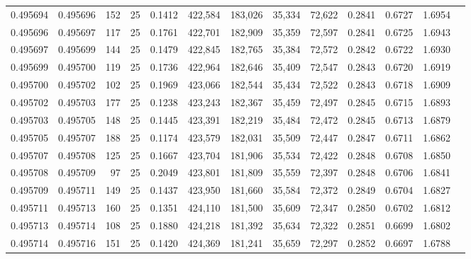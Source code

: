 \begin{tabular}{rrrrrrrrrrrrr}
0.495694 & 0.495696 &   152 &  25 &                                     0.1412 & 422,584 & 183,026 &  35,334 &  72,622 & 0.2841 & 0.6727 & 1.6954 \\
0.495696 & 0.495697 &   117 &  25 &                                     0.1761 & 422,701 & 182,909 &  35,359 &  72,597 & 0.2841 & 0.6725 & 1.6943 \\
0.495697 & 0.495699 &   144 &  25 &                                     0.1479 & 422,845 & 182,765 &  35,384 &  72,572 & 0.2842 & 0.6722 & 1.6930 \\
0.495699 & 0.495700 &   119 &  25 &                                     0.1736 & 422,964 & 182,646 &  35,409 &  72,547 & 0.2843 & 0.6720 & 1.6919 \\
0.495700 & 0.495702 &   102 &  25 &                                     0.1969 & 423,066 & 182,544 &  35,434 &  72,522 & 0.2843 & 0.6718 & 1.6909 \\
0.495702 & 0.495703 &   177 &  25 &                                     0.1238 & 423,243 & 182,367 &  35,459 &  72,497 & 0.2845 & 0.6715 & 1.6893 \\
0.495703 & 0.495705 &   148 &  25 &                                     0.1445 & 423,391 & 182,219 &  35,484 &  72,472 & 0.2845 & 0.6713 & 1.6879 \\
0.495705 & 0.495707 &   188 &  25 &                                     0.1174 & 423,579 & 182,031 &  35,509 &  72,447 & 0.2847 & 0.6711 & 1.6862 \\
0.495707 & 0.495708 &   125 &  25 &                                     0.1667 & 423,704 & 181,906 &  35,534 &  72,422 & 0.2848 & 0.6708 & 1.6850 \\
0.495708 & 0.495709 &    97 &  25 &                                     0.2049 & 423,801 & 181,809 &  35,559 &  72,397 & 0.2848 & 0.6706 & 1.6841 \\
0.495709 & 0.495711 &   149 &  25 &                                     0.1437 & 423,950 & 181,660 &  35,584 &  72,372 & 0.2849 & 0.6704 & 1.6827 \\
0.495711 & 0.495713 &   160 &  25 &                                     0.1351 & 424,110 & 181,500 &  35,609 &  72,347 & 0.2850 & 0.6702 & 1.6812 \\
0.495713 & 0.495714 &   108 &  25 &                                     0.1880 & 424,218 & 181,392 &  35,634 &  72,322 & 0.2851 & 0.6699 & 1.6802 \\
0.495714 & 0.495716 &   151 &  25 &                                     0.1420 & 424,369 & 181,241 &  35,659 &  72,297 & 0.2852 & 0.6697 & 1.6788 \\

\end{tabular}
